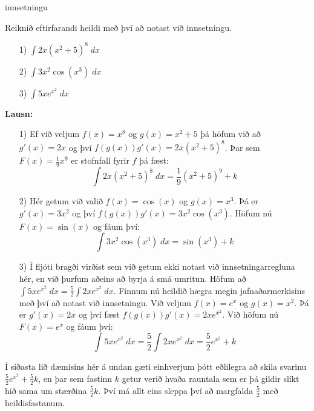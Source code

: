 \begin{syn}{innsetningu}

Reiknið eftirfarandi heildi með því að notast við innsetningu.

\begin{itemize}
\item[1)] $\displaystyle \int 2x(x^{2}+5)^{8}\; dx$

\item[2)] $\displaystyle \int 3x^{2}\cos\left(x^{3}\right)\; dx$

\item[3)] $\displaystyle \int 5xe^{x^{2}}\; dx$
\end{itemize}

{\bf Lausn:}
\begin{itemize}
\item[1)] Ef við veljum $f(x) = x^{8}$ og $g(x) = x^{2}+5$ þá höfum við að $g'(x) = 2x$ og því $f(g(x))g'(x) = 2x(x^{2}+5)^{8}$. Þar sem $F(x) = \frac{1}{9}x^{9}$ er stofnfall fyrir $f$ þá fæst:
$$
\int 2x(x^{2}+5)^{8}\; dx = \frac{1}{9}(x^{2}+5)^{9} + k
$$

\item[2)] Hér getum við valið $f(x) = \cos(x)$ og $g(x) = x^{3}$. Þá er $g'(x) = 3x^{2}$ og því $f(g(x))g'(x) = 3x^{2}\cos\left(x^{3}\right)$. Höfum nú $F(x) = \sin(x)$ og fáum því:
$$
\int 3x^{2}\cos\left(x^{3}\right)\; dx = \sin\left(x^{3}\right) + k
$$

\item[3)] Í fljóti bragði virðist sem við getum ekki notast við innsetningarregluna hér, en við þurfum aðeins að byrja á smá umritun. Höfum að $\displaystyle \int 5xe^{x^{2}}\; dx = \frac{5}{2}\int 2xe^{x^{2}}\; dx$. Finnum nú heildið hægra megin jafnaðarmerkisins með því að notast við innsetningu. Við veljum $f(x) = e^{x}$ og $g(x) = x^{2}$. Þá er $g'(x) = 2x$ og því fæst $f(g(x))g'(x) = 2xe^{x^{2}}$. Við höfum nú $F(x) = e^{x}$ og fáum því:
$$
\int 5xe^{x^{2}}\; dx = \frac{5}{2}\int 2xe^{x^{2}} \; dx = \frac{5}{2}e^{x^{2}} + k
$$
\end{itemize}

\end{syn}

\newpage

\begin{ath}
Í síðasta lið dæmisins hér á undan gæti einhverjum þótt eðlilegra að skila svarinu $\displaystyle \frac{5}{2}e^{x^{2}}+\frac{5}{2}k$, en þar sem fastinn $k$ getur verið hvaða rauntala sem er þá gildir slíkt hið sama um stærðina $\frac{5}{2}k$. Því má allt eins sleppa því að margfalda $\frac{5}{2}$ með heildisfastanum.
\end{ath}

